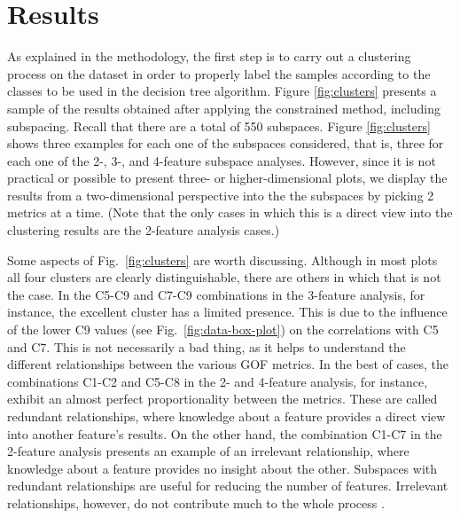
\section{Results}
\label{sec:results}

As explained in the methodology, the first step is to carry out a clustering process on the dataset in order to properly label the samples according to the classes to be used in the decision tree algorithm. Figure \ref{fig:clusters} presents a sample of the results obtained after applying the constrained \kmeans{} method, including subspacing. Recall that there are a total of 550 subspaces. Figure \ref{fig:clusters} shows three examples for each one of the subspaces considered, that is, three for each one of the 2-, 3-, and 4-feature subspace analyses. However, since it is not practical or possible to present three- or higher-dimensional plots, we display the results from a two-dimensional perspective into the the subspaces by picking 2 metrics at a time. (Note that the only cases in which this is a direct view into the clustering results are the 2-feature analysis cases.)

Some aspects of Fig.~\ref{fig:clusters} are worth discussing. Although in most plots all four clusters are clearly distinguishable, there are others in which that is not the case. In the C5-C9 and C7-C9 combinations in the 3-feature analysis, for instance, the excellent cluster has a limited presence. This is due to the influence of the lower C9 values (see Fig.~\ref{fig:data-box-plot}) on the correlations with C5 and C7. This is not necessarily a bad thing, as it helps to understand the different relationships between the various GOF metrics. In the best of cases, the combinations C1-C2 and C5-C8 in the 2- and 4-feature analysis, for instance, exhibit an almost perfect proportionality between the metrics. These are called redundant relationships, where knowledge about a feature provides a direct view into another feature's results. On the other hand, the combination C1-C7 in the 2-feature analysis presents an example of an irrelevant relationship, where knowledge about a feature provides no insight about the other. Subspaces with redundant relationships are useful for reducing the number of features. Irrelevant relationships, however, do not contribute much to the whole process \citep{Dy_2004_MLR}. 

